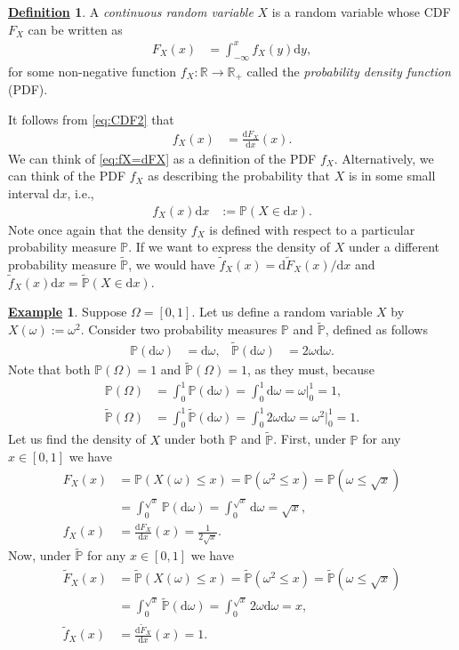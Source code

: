 \documentclass[12pt]{book}
\numberwithin{equation}{chapter}
\theoremstyle{plain}
\numberwithin{theorem}{section}
\theoremstyle{definition}
\newtheorem{definition}[theorem]{\underline{Definition}}
\newtheorem{example}[theorem]{\underline{Example}}
\numberwithin{exercise}{chapter}
\newcommand{\<}{\langle}
\renewcommand{\>}{\rangle}
\renewcommand{\(}{\left(}
\renewcommand{\)}{\right)}
\renewcommand{\[}{\left[}
\renewcommand{\]}{\right]}
\newcommand\Pb{\mathds{P}}
\newcommand\Rb{\mathds{R}}
\newcommand\om{\omega}
\newcommand\Om{\Omega}
\newcommand\Pbt{\widetilde{\Pb}}
\newcommand\ft{\widetilde{f}}
\newcommand\Ft{\widetilde{F}}
\newcommand\dd{\mathrm{d}}
\theoremstyle{definition}
\numberwithin{question}{section}
\begin{document}
\begin{definition}
\label{def:cont.rv}
A \textit{continuous random variable} $X$ is a random variable whose CDF $F_X$ can be written as
\begin{align}
F_X(x)
	&=	\int_{-\infty}^x f_X(y) \dd y , \label{eq:CDF2}
\end{align}
for some non-negative function $f_X : \Rb \to \Rb_+$ called the \textit{probability density function} (PDF).
\end{definition}

\noindent
It follows from \eqref{eq:CDF2} that
\begin{align}
f_X(x)
	&=	\frac{\dd F_X}{\dd x}(x) . \label{eq:fX=dFX}
\end{align}
We can think of \eqref{eq:fX=dFX} as a definition of the PDF $f_X$.  Alternatively, we can think of the PDF $f_X$ as describing the probability that $X$ is in some small interval $\dd x$, i.e.,
\begin{align}
f_X(x) \dd x
	&:=	\Pb( X \in \dd x ) . \label{eq:pdf}
\end{align}
Note once again that the density $f_X$ is defined with respect to a particular probability measure $\Pb$.
If we want to express the density of $X$ under a different probability measure $\Pbt$, we would have $\ft_X(x) = \dd \Ft_X(x) / \dd x$ and $\ft_X(x) \dd x = \Pbt( X \in \dd x)$. 

\begin{example}
Suppose $\Om = [0,1]$.  Let us define a random variable $X$ by $X(\om) := \om^2$.  Consider two probability measures $\Pb$ and $\Pbt$, defined as follows
\begin{align}
\Pb (\dd \om )
	&=	\dd \om , &
\Pbt (\dd \om )
	&=	2 \om \dd \om .
\end{align}
Note that both $\Pb(\Om) = 1$ and $\Pbt(\Om) = 1$, as they must, because
\begin{align}
\Pb(\Om)
	&=	\int_0^1 \Pb(\dd \om) = \int_0^1 \dd \om = \om \Big|_0^1 = 1 , \\
\Pbt(\Om)
	&=	\int_0^1 \Pbt(\dd \om) = \int_0^1 2 \om \dd \om = \om^2 \Big|_0^1 = 1 .
\end{align}
Let us find the density of $X$ under both $\Pb$ and $\Pbt$.  First, under $\Pb$ for any $x \in [0,1]$ we have
\begin{align}
F_X(x)
	&=	\Pb( X(\om) \leq x )
	=		\Pb( \om^2 \leq x ) 
	=		\Pb( \om \leq \sqrt{x} ) \\
	&=		\int_0^{\sqrt{x}} \Pb(\dd \om ) 
	=		\int_0^{\sqrt{x}} \dd \om
	=		\sqrt{x} , \\
f_X(x)
	&=	\frac{\dd F_X}{\dd x}(x)
	=		\frac{1}{2\sqrt{x}} .
\end{align}
Now, under $\Pbt$ for any $x \in [0,1]$ we have
\begin{align}
\Ft_X(x)
	&=	\Pbt( X(\om) \leq x )
	=		\Pbt( \om^2 \leq x ) 
	=		\Pbt( \om \leq \sqrt{x} ) \\
	&=	\int_0^{\sqrt{x}} \Pbt(\dd \om ) 
	=		\int_0^{\sqrt{x}} 2 \om \dd \om
	=		x , \\
\ft_X(x)
	&=	\frac{\dd \Ft_X}{\dd x}(x)
	=		1 .
\end{align}
\end{example}
\end{document}
